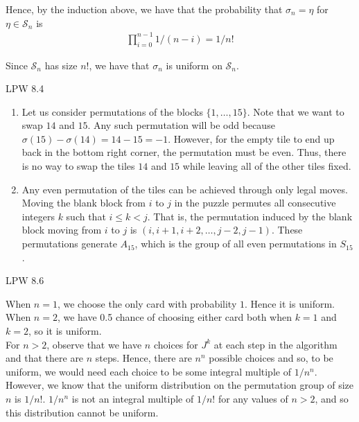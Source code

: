 \documentclass[12pt]{article}
\newenvironment{problem}[2][Problem]{\begin{trivlist}
\item[\hskip \labelsep {\bfseries #1}\hskip \labelsep {\bfseries #2.}]}{\end{trivlist}}
\begin{document}
Hence, by the induction above, we have that the probability that $\sigma_n = \eta$ for $\eta \in \mathcal{S}_n$ is
\begin{align*}
 \prod_{i=0}^{n-1} 1/(n-i) = 1/n!
\end{align*}

Since $\mathcal{S}_n$ has size $n!$, we have that $\sigma_n$ is uniform on $\mathcal{S}_n$.

\begin{problem}{II}
LPW 8.4
\end{problem}

\begin{enumerate}[label=\alph*)]

\item Let us consider permutations of the blocks $\{1, \ldots, 15\}$. Note that we want to swap $14$ and $15$. Any such permutation will be odd because $\sigma(15) - \sigma(14) = 14 - 15 = -1$. However, for the empty tile to end up back in the bottom right corner, the permutation must be even. Thus, there is no way to swap the tiles $14$ and $15$ while leaving all of the other tiles fixed.

\item Any even permutation of the tiles can be achieved through only legal moves. Moving the blank block from $i$ to $j$ in the puzzle permutes all consecutive integers $k$ such that $i \leq k < j$. That is, the permutation induced by the blank block moving from $i$ to $j$ is $(i, i+1, i+2, \ldots, j-2, j-1)$. These permutations generate $A_{15}$, which is the group of all even permutations in $S_{15}$.

\end{enumerate}

\begin{problem}{III}
LPW 8.6
\end{problem}

When $n = 1$, we choose the only card with probability $1$. Hence it is uniform. When $n = 2$, we have 0.5 chance of choosing either card both when $k = 1$ and $k = 2$, so it is uniform.\\

For $n > 2$, observe that we have $n$ choices for $J^k$ at each step in the algorithm and that there are $n$ steps. Hence, there are $n^n$ possible choices and so, to be uniform, we would need each choice to be some integral multiple of $1/n^n$. However, we know that the uniform distribution on the permutation group of size $n$ is $1/n!$. $1/n^n$ is not an integral multiple of $1/n!$ for any values of $n > 2$, and so this distribution cannot be uniform.
\end{document}
